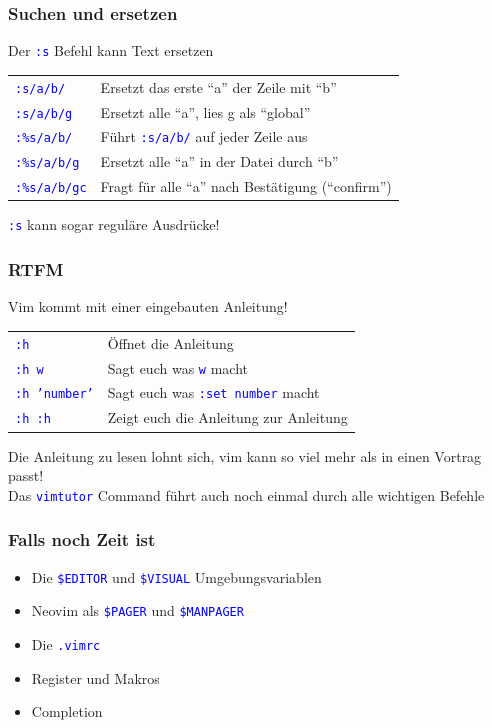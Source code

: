 \documentclass{beamer}
\newcommand{\cmd}[1]{\textcolor{blue}{\texttt{#1}}}
\begin{document}
\begin{frame}
  \frametitle{Suchen und ersetzen}
  Der \cmd{:s} Befehl kann Text ersetzen \\[0.5cm]

  \begin{tabular}{l | l}
    \cmd{:s/a/b/} & Ersetzt das erste \enquote{a} der Zeile mit \enquote{b} \\[0.2cm]
    \cmd{:s/a/b/g} & Ersetzt alle \enquote{a}, lies g als \enquote{global} \\[0.2cm]
    \cmd{:\%s/a/b/} & Führt \cmd{:s/a/b/} auf jeder Zeile aus \\[0.2cm]
    \cmd{:\%s/a/b/g} & Ersetzt alle \enquote{a} in der Datei durch \enquote{b} \\[0.2cm]
    \cmd{:\%s/a/b/gc} & Fragt für alle \enquote{a} nach Bestätigung (\enquote{confirm}) \\[0.2cm]
  \end{tabular}

  \vspace{0.5cm}

  \cmd{:s} kann sogar reguläre Ausdrücke!
\end{frame}

\begin{frame}
  \frametitle{RTFM}
  Vim kommt mit einer eingebauten Anleitung! \\[0.5cm]

  \begin{tabular}{l | l}
    \cmd{:h} & Öffnet die Anleitung \\[0.2cm]
    \cmd{:h w} & Sagt euch was \cmd{w} macht \\[0.2cm]
    \cmd{:h 'number'} & Sagt euch was \cmd{:set number} macht \\[0.2cm]
    \cmd{:h :h} & Zeigt euch die Anleitung zur Anleitung
  \end{tabular}

  \vspace{0.5cm}

  Die Anleitung zu lesen lohnt sich, vim kann so viel mehr als in einen Vortrag passt! \\[0.3cm]
  Das \cmd{vimtutor} Command führt auch noch einmal durch alle wichtigen Befehle
\end{frame}

\begin{frame}
  \frametitle{Falls noch Zeit ist}
  \begin{itemize}
    \item Die \cmd{\$EDITOR} und \cmd{\$VISUAL} Umgebungsvariablen \\[0.2cm]
    \item Neovim als \cmd{\$PAGER} und \cmd{\$MANPAGER} \\[0.2cm]
    \item Die \cmd{.vimrc} \\[0.2cm]
    \item Register und Makros \\[0.2cm]
    \item Completion
  \end{itemize}
\end{frame}
\end{document}
